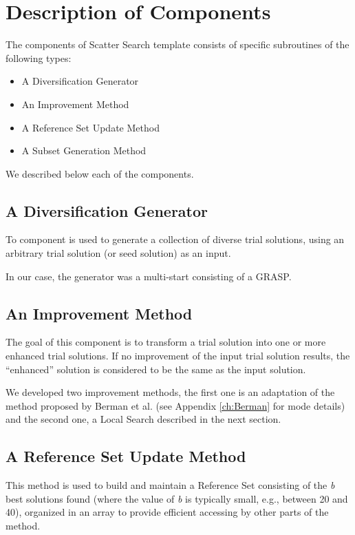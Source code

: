 \section{Description of Components}
The components of Scatter Search template \cite{glover1998template}
consists of
specific subroutines of the following types:
\begin{itemize}
\item A Diversification Generator
\item An Improvement Method
\item A Reference Set Update Method
\item A Subset Generation Method
\end{itemize}
We described below
each of the components.

\subsection{A Diversification Generator}
To component is used to generate
a collection of diverse trial solutions,
using an arbitrary trial solution
(or seed solution) as an input.

In our case,
the generator was a multi-start
consisting of a GRASP.


\subsection{An Improvement Method}
The goal of this component
is to transform a trial solution
into one or more enhanced trial solutions. 
If no improvement
of the input trial solution results, 
the ``enhanced'' solution
is considered to be
the same as the input solution.

We developed two improvement methods,
the first one is an adaptation
of the method proposed by Berman et al. \cite{berman1987stochastic}
(see Appendix \ref{ch:Berman} for mode details)
and the second one,
a Local Search
described in the next section.


\subsection{A Reference Set Update Method}
This method is used
to build and maintain a Reference Set
consisting of the \textit{b} best solutions found
(where the value of \textit{b}
is typically small,
e.g., between 20 and 40),
organized in an array
to provide efficient accessing
by other parts of the method.

